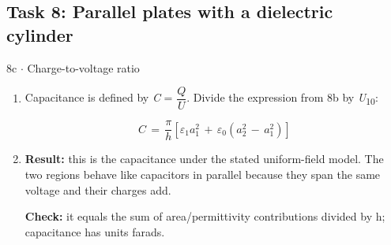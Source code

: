 \documentclass[11pt]{article}
\begin{document}
\begin{keepsection}\subsection{Task 8: Parallel plates with a dielectric cylinder}

\begin{workedbox}{8c \ensuremath{\cdot} Charge-to-voltage ratio}
\begin{enumerate}
\item {}
Capacitance is defined by \textit{C} = {\small\ensuremath{\dfrac{{Q}}{{U}}}}. Divide the expression from 8b by \textit{U}\textsubscript{10}:

\begin{equation*}{C}\, =\, \dfrac{{π}}{{h}}[{ε}_{1}{a}_{1}^{2}\, +\, {ε}_{0}({a}_{2}^{2}\, -\, {a}_{1}^{2})]\end{equation*}
\item {}
\textbf{Result:} this is the capacitance under the stated uniform-field model. The two regions behave like capacitors in parallel because they span the same voltage and their charges add.

\textbf{Check:} it equals the sum of area/permittivity contributions divided by h; capacitance has units farads.
\end{enumerate}
\end{workedbox}

\end{keepsection}
\end{document}
